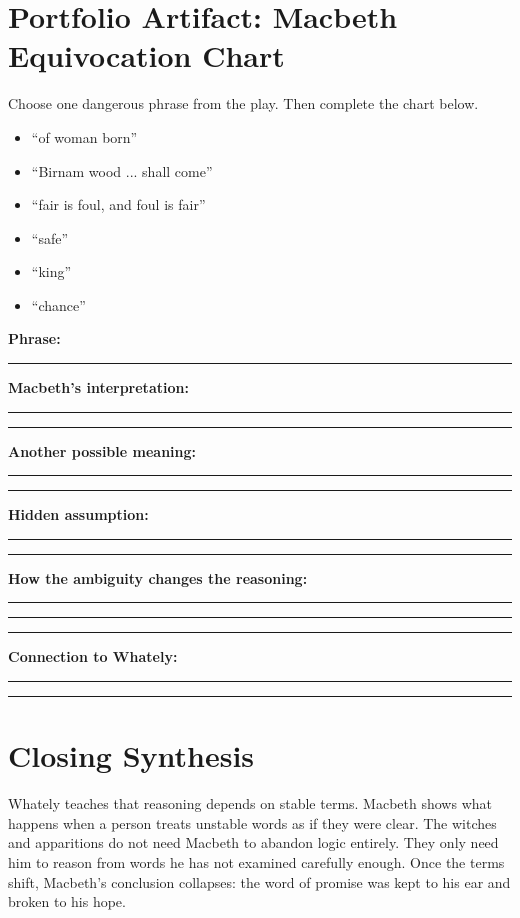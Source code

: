 \documentclass[12pt]{article}
\newcommand{\studentline}{\par\vspace{0.68em}\hrule\vspace{0.72em}}
\begin{document}
\section*{Portfolio Artifact: Macbeth Equivocation Chart}
Choose one dangerous phrase from the play. Then complete the chart below.

\begin{itemize}[leftmargin=*]
\item ``of woman born''
\item ``Birnam wood ... shall come''
\item ``fair is foul, and foul is fair''
\item ``safe''
\item ``king''
\item ``chance''
\end{itemize}

\textbf{Phrase:}\studentline
\textbf{Macbeth's interpretation:}\studentline\studentline
\textbf{Another possible meaning:}\studentline\studentline
\textbf{Hidden assumption:}\studentline\studentline
\textbf{How the ambiguity changes the reasoning:}\studentline\studentline\studentline
\textbf{Connection to Whately:}\studentline\studentline

\section*{Closing Synthesis}
Whately teaches that reasoning depends on stable terms. Macbeth shows what happens when a person treats unstable words as if they were clear. The witches and apparitions do not need Macbeth to abandon logic entirely. They only need him to reason from words he has not examined carefully enough. Once the terms shift, Macbeth's conclusion collapses: the word of promise was kept to his ear and broken to his hope.
\end{document}
